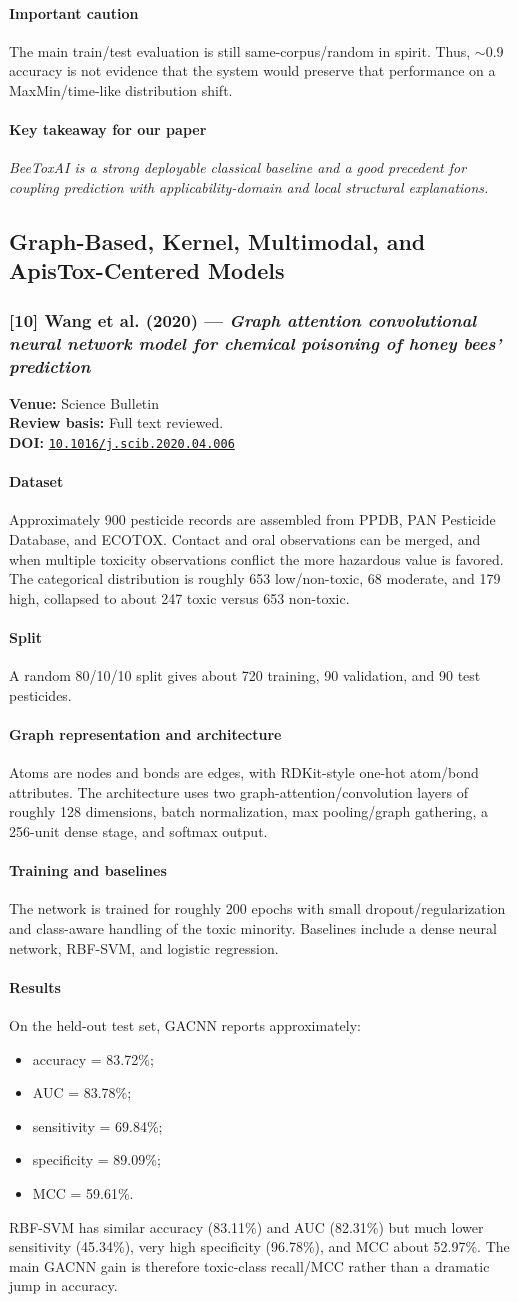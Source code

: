 \documentclass[11pt]{article}
\newcommand{\reviewfield}[2]{\paragraph{#1}#2}
\newcommand{\keytakeaway}[1]{\paragraph{Key takeaway for our paper}\emph{#1}}
\newcommand{\paperdoi}[1]{\href{https://doi.org/#1}{\texttt{#1}}}
\begin{document}
\reviewfield{Important caution}{
The main train/test evaluation is still same-corpus/random in spirit. Thus, $\sim0.9$ accuracy is not evidence that the system would preserve that performance on a MaxMin/time-like distribution shift.
}

\keytakeaway{BeeToxAI is a strong deployable classical baseline and a good precedent for coupling prediction with applicability-domain and local structural explanations.}

\subsection{Graph-Based, Kernel, Multimodal, and ApisTox-Centered Models}

\subsubsection{[10] Wang et al. (2020) --- \textit{Graph attention convolutional neural network model for chemical poisoning of honey bees' prediction}}
\textbf{Venue:} Science Bulletin\\
\textbf{Review basis:} Full text reviewed.\\
\textbf{DOI:} \paperdoi{10.1016/j.scib.2020.04.006}

\reviewfield{Dataset}{
Approximately 900 pesticide records are assembled from PPDB, PAN Pesticide Database, and ECOTOX. Contact and oral observations can be merged, and when multiple toxicity observations conflict the more hazardous value is favored. The categorical distribution is roughly 653 low/non-toxic, 68 moderate, and 179 high, collapsed to about 247 toxic versus 653 non-toxic.
}

\reviewfield{Split}{
A random 80/10/10 split gives about 720 training, 90 validation, and 90 test pesticides.
}

\reviewfield{Graph representation and architecture}{
Atoms are nodes and bonds are edges, with RDKit-style one-hot atom/bond attributes. The architecture uses two graph-attention/convolution layers of roughly 128 dimensions, batch normalization, max pooling/graph gathering, a 256-unit dense stage, and softmax output.
}

\reviewfield{Training and baselines}{
The network is trained for roughly 200 epochs with small dropout/regularization and class-aware handling of the toxic minority. Baselines include a dense neural network, RBF-SVM, and logistic regression.
}

\reviewfield{Results}{
On the held-out test set, GACNN reports approximately:
\begin{itemize}
    \item accuracy = 83.72\%;
    \item AUC = 83.78\%;
    \item sensitivity = 69.84\%;
    \item specificity = 89.09\%;
    \item MCC = 59.61\%.
\end{itemize}
RBF-SVM has similar accuracy (83.11\%) and AUC (82.31\%) but much lower sensitivity (45.34\%), very high specificity (96.78\%), and MCC about 52.97\%. The main GACNN gain is therefore toxic-class recall/MCC rather than a dramatic jump in accuracy.
}
\end{document}
